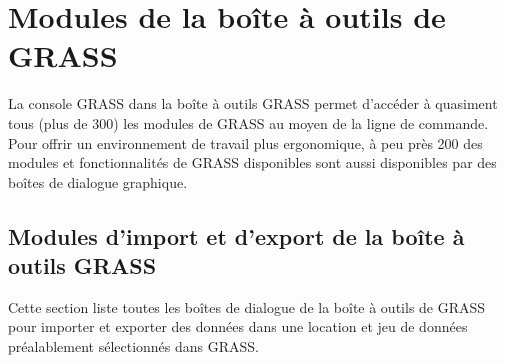 \section{Modules de la boîte à outils de GRASS }\label{appdx_grass_toolbox_modules}

La console GRASS dans la boîte à outils GRASS permet d'accéder à quasiment tous (plus de 300) les modules de GRASS au moyen de la ligne de commande. Pour offrir un environnement de travail plus ergonomique, à peu près 200 des modules et fonctionnalités de GRASS disponibles sont aussi disponibles par des boîtes de dialogue graphique.

\subsection{Modules d'import et d'export de la boîte à outils GRASS}

Cette section liste toutes les boîtes de dialogue de la boîte à outils de GRASS pour importer et exporter des données dans une location et jeu de données préalablement sélectionnés dans GRASS.

